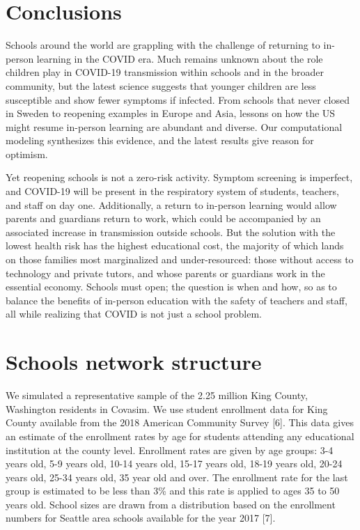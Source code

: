 \documentclass[preprint,12pt]{elsarticle}
\begin{document}
\section{Conclusions}

Schools around the world are grappling with the challenge of returning to in-person learning in the COVID era. Much remains unknown about the role children play in COVID-19 transmission within schools and in the broader community, but the latest science suggests that younger children are less susceptible and show fewer symptoms if infected. From schools that never closed in Sweden to reopening examples in Europe and Asia, lessons on how the US might resume in-person learning are abundant and diverse. Our computational modeling synthesizes this evidence, and the latest results give reason for optimism.

Yet reopening schools is not a zero-risk activity. Symptom screening is imperfect, and COVID-19 will be present in the respiratory system of students, teachers, and staff on day one. Additionally, a return to in-person learning would allow parents and guardians return to work, which could be accompanied by an associated increase in transmission outside schools. But the solution with the lowest health risk has the highest educational cost, the majority of which lands on those families most marginalized and under-resourced: those without access to technology and private tutors, and whose parents or guardians work in the essential economy. Schools must open; the question is when and how, so as to balance the benefits of in-person education with the safety of teachers and staff, all while realizing that COVID is not just a school problem.


\printbibliography

\appendix

\section{Schools network structure}
\label{sec:AppendixA}

We simulated a representative sample of the 2.25 million King County, Washington residents in Covasim. We use student enrollment data for King County available from the 2018 American Community Survey [6]. This data gives an estimate of the enrollment rates by age for students attending any educational institution at the county level. Enrollment rates are given by age groups: 3-4 years old, 5-9 years old, 10-14 years old, 15-17 years old, 18-19 years old, 20-24 years old, 25-34 years old, 35 year old and over. The enrollment rate for the last group is estimated to be less than 3\%   and this rate is applied to ages 35 to 50 years old. School sizes are drawn from a distribution based on the enrollment numbers for Seattle area schools available for the year 2017 [7].
\end{document}
